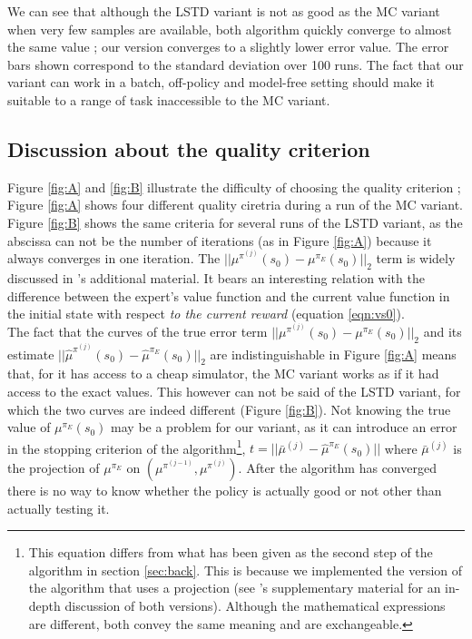 \documentclass{jfpda2011}
\begin{document}
We can see that although the LSTD variant is not as good as the MC variant when very few samples are available, both algorithm quickly converge to almost the same value ; our version converges to a slightly lower error value. The error bars shown correspond to the standard deviation over 100 runs. The fact that our variant can work in a batch, off-policy and model-free setting should make it suitable to a range of task inaccessible to the MC variant.
\subsection{Discussion about the quality criterion}
\label{ssec:quality}
Figure \ref{fig:A} and \ref{fig:B} illustrate the difficulty of choosing the quality criterion ; Figure \ref{fig:A} shows four different quality ciretria during a run of the MC variant. Figure \ref{fig:B} shows the same criteria for several runs of the LSTD variant, as the abscissa can not be the number of iterations (as in Figure \ref{fig:A}) because it always converges in one iteration. The $||\mu^{\pi^{(j)}}(s_0) - \mu^{\pi_E}(s_0)||_2$ term is widely discussed in \citep{abbeel2004apprenticeship}'s additional material. It bears an interesting relation with the difference between the expert's value function and the current value function in the initial state with respect \emph{to the current reward} (equation \ref{eqn:vs0}).\\

The fact that  the curves of the true error term $||\mu^{\pi^{(j)}}(s_0) - \mu^{\pi_E}(s_0)||_2$ and  its estimate $||\hat\mu^{\pi^{(j)}}(s_0) - \hat\mu^{\pi_E}(s_0)||_2$ are indistinguishable in Figure \ref{fig:A} means that, for it has access to a cheap simulator, the MC variant works as if it had access to the exact values. This however can not be said of the LSTD variant, for which the two curves are indeed different (Figure \ref{fig:B}). Not knowing the true value of $\mu^{\pi_E}(s_0)$ may be a problem for our variant, as it can introduce an error in the stopping criterion of the algorithm\footnote{This equation differs from what has been given as the second step of the algorithm in section \ref{sec:back}. This is because we implemented the version of the algorithm that uses a projection (see \citet{abbeel2004apprenticeship}'s supplementary material for an in-depth discussion of both versions). Although the mathematical expressions are different, both convey the same meaning and are exchangeable.}, $t = ||\bar\mu^{(j)}-\hat\mu^{\pi_E}(s_0)||$ where $\bar\mu^{(j)}$ is the projection of $\mu^{\pi_E}$ on $(\mu^{\pi^{(j-1)}},\mu^{\pi^{(j)}})$. After the algorithm has converged there is no way to know whether the policy is actually good or not other than actually testing it.\\
\end{document}

